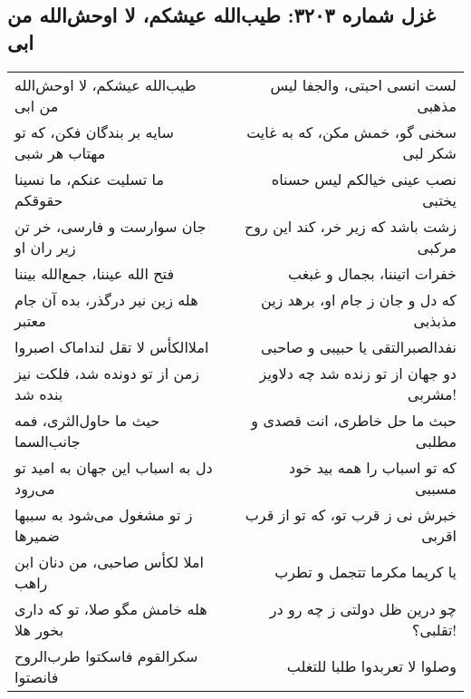 \begin{center}
\section*{غزل شماره ۳۲۰۳: طیب‌الله عیشکم، لا اوحش‌الله من ابی}
\label{sec:3203}
\begin{longtable}{l p{0.5cm} r}
طیب‌الله عیشکم، لا اوحش‌الله من ابی
&&
لست انسی احبتی، والجفا لیس مذهبی
\\
سایه بر بندگان فکن، که تو مهتاب هر شبی
&&
سخنی گو، خمش مکن، که به غایت شکر لبی
\\
ما تسلیت عنکم، ما نسینا حقوقکم
&&
نصب عینی خیالکم لیس حسناه یختبی
\\
جان سوارست و فارسی، خر تن زیر ران او
&&
زشت باشد که زیر خر، کند این روح مرکبی
\\
فتح الله عیننا، جمع‌الله بیننا
&&
خفرات اتیننا، بجمال و غبغب
\\
هله زین نیر درگذر، بده آن جام معتبر
&&
که دل و جان ز جام او، برهد زین مذبذبی
\\
املاالکأس لا تقل لنداماک اصبروا
&&
نفدالصبرالتقی یا حبیبی و صاحبی
\\
زمن از تو دونده شد، فلکت نیز بنده شد
&&
دو جهان از تو زنده شد چه دلاویز مشربی!
\\
حیث ما حاول‌الثری، فمه جانب‌السما
&&
حبث ما حل خاطری، انت قصدی و مطلبی
\\
دل به اسباب این جهان به امید تو می‌رود
&&
که تو اسباب را همه بید خود مسببی
\\
ز تو مشغول می‌شود به سببها ضمیرها
&&
خبرش نی ز قرب تو، که تو از قرب اقربی
\\
املا لکأس صاحبی، من دنان ابن راهب
&&
یا کریما مکرما تتجمل و تطرب
\\
هله خامش مگو صلا، تو که داری بخور هلا
&&
چو درین ظل دولتی ز چه رو در تقلبی؟!
\\
سکرالقوم فاسکتوا طرب‌الروح فانصتوا
&&
وصلوا لا تعربدوا طلبا للتغلب
\\
\end{longtable}
\end{center}
